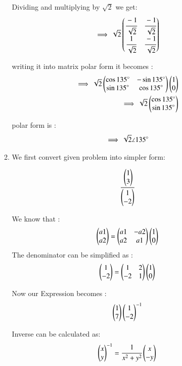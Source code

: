 \begin{enumerate}[label=\thesection.\arabic*.,ref=\thesection.\theenumi]
\begin{enumerate}
Dividing and multiplying by $\sqrt{2}$ we get:
\begin{align}
    \implies \sqrt{2}\begin{pmatrix}\cfrac{-1}{\sqrt{2}} & \cfrac{-1}{\sqrt{2}} \\ \cfrac{1}{\sqrt{2}} & \cfrac{-1}{\sqrt{2}}\end{pmatrix}
\end{align}

writing it into matrix polar form it becomes :
\begin{align}
    \implies \sqrt{2}\begin{pmatrix}\cos{135}\degree & -\sin{135}\degree\\ \sin{135}\degree & \cos{135}\degree\end{pmatrix}\begin{pmatrix}1 \\ 0\end{pmatrix}
\\
    \implies \sqrt{2}\begin{pmatrix}\cos{135}\degree \\ \sin{135}\degree\end{pmatrix}
\end{align}

polar form is :
\begin{align}
    \implies \sqrt{2} \angle 135 \degree
\end{align}



\item We first convert given problem into simpler form:

\begin{align}
    \cfrac{\begin{pmatrix}1 \\ 3\end{pmatrix}}{\begin{pmatrix}1 \\ -2\end{pmatrix}}
\end{align} 

We know that :
\begin{align}
    \begin{pmatrix}a1 \\ a2\end{pmatrix} = \begin{pmatrix}a1 & -a2\\a2 & a1\end{pmatrix}\begin{pmatrix}1 \\ 0\end{pmatrix}
\end{align}
The denominator can be simplified as :
\begin{align}
    \begin{pmatrix}1 \\ -2\end{pmatrix} = \begin{pmatrix}1 & 2\\-2 & 1\end{pmatrix}\begin{pmatrix}1 \\ 0\end{pmatrix}
\end{align}

Now our Expression becomes :
\begin{align}
    \begin{pmatrix}1 \\ 7\end{pmatrix}\begin{pmatrix}1\\-2\end{pmatrix}^{-1}
\end{align}

Inverse can be calculated as:
\begin{align}
    \begin{pmatrix}x \\ y\end{pmatrix}^{-1}=\cfrac{1}{x^2+y^2}\begin{pmatrix}x\\-y\end{pmatrix}
\end{align}


\end{enumerate}
\end{enumerate}
